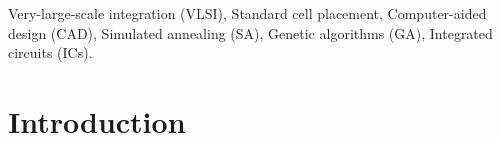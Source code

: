 \documentclass[conference]{IEEEtran}
\begin{document}

\begin{IEEEkeywords}

Very-large-scale integration (VLSI), Standard cell placement, Computer-aided design (CAD), Simulated annealing (SA), Genetic algorithms (GA), Integrated circuits (ICs).

\end{IEEEkeywords}


\section{Introduction}
\end{document}
